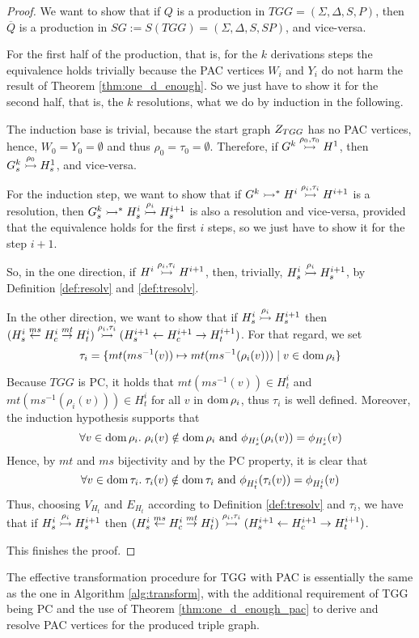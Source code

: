 \begin{proof}
	We want to show that if $Q$ is a production in $TGG = (\Sigma, \Delta, S, P)$, then $\overline{Q}$ is a production in $SG := S(TGG) = (\Sigma, \Delta, S, SP)$, and vice-versa.
	
	For the first half of the production, that is, for the $k$ derivations steps the equivalence holds trivially because the PAC vertices $W_i$ and $Y_i$ do not harm the result of Theorem \ref{thm:one_d_enough}. So we just have to show it for the second half, that is, the $k$ resolutions, what we do by induction in the following.
	
	The induction base is trivial, because the start graph $Z_{TGG}$ has no PAC vertices, hence, $W_0 = Y_0 = \emptyset$ and thus $\rho_0 = \tau_0 = \emptyset$. Therefore, if $G^k \overset{\rho_0,\tau_0}{\rightarrowtail} H^1$, then $G^k_s \overset{\rho_0}{\rightarrowtail} H_s^1$, and vice-versa.
	
	For the induction step, we want to show that if $G^k \rightarrowtail^*_{} H^i \overset{\rho_{i},\tau_{i}}{\rightarrowtail} H^{i+1}$ is a resolution, then $G^k_s \rightarrowtail^*_{} H^i_s \overset{\rho_{i}}{\rightarrowtail} H^{i+1}_s$ is also a resolution and vice-versa, provided that the equivalence holds for the first $i$ steps, so we just have to show it for the step $i+1$.
	
	So, in the one direction, if $H^i \overset{\rho_{i},\tau_{i}}{\rightarrowtail} H^{i+1}$, then, trivially, $H^i_s \overset{\rho_{i}}{\rightarrowtail} H^{i+1}_s$, by Definition \ref{def:resolv} and \ref{def:tresolv}.
	
	In the other direction, we want to show that if $H^i_s \overset{\rho_{i}}{\rightarrowtail} H^{i+1}_s$ then $(H^i_s \overset{ms}{\leftarrow} H^i_c \overset{mt}{\rightarrow} H^i_t) \overset{\rho_i,\tau_i}{\rightarrowtail} (H^{i+1}_s \overset{}{\leftarrow} H^{i+1}_c \overset{}{\rightarrow} H^{i+1}_t)$. For that regard, we set 
	\[
		\tau_i = \{mt(ms^{-1}(v)) \mapsto mt(ms^{-1}(\rho_i(v))) \; | \; v \in \operatorname{dom} \rho_i \}
	\]
	
	Because $TGG$ is PC, it holds that $mt(ms^{-1}(v)) \in H^i_t$ and $mt(ms^{-1}(\rho_i(v))) \in H^i_t$ for all $v$ in $\operatorname{dom} \rho_i$, thus $\tau_i$ is well defined. Moreover, the induction hypothesis supports that
	\[
		\forall v \in \operatorname{dom} \rho_i . \; \rho_i(v) \notin \operatorname{dom} \rho_i \text{ and } \phi_{H^i_s}(\rho_i(v)) = \phi_{H^i_s}(v)
	\]
	Hence, by $mt$ and $ms$ bijectivity and by the PC property, it is clear that
	\[
		\forall v \in \operatorname{dom} \tau_i . \; \tau_i(v) \notin \operatorname{dom} \tau_i \text{ and } \phi_{H^i_t}(\tau_i(v)) = \phi_{H^i_t}(v)
	\]
	Thus, choosing $V_{H_t}$ and $E_{H_t}$ according to Definition \ref{def:tresolv} and $\tau_i$, we have that if $H^i_s \overset{\rho_{i}}{\rightarrowtail} H^{i+1}_s$ then $(H^i_s \overset{ms}{\leftarrow} H^i_c \overset{mt}{\rightarrow} H^i_t) \overset{\rho_i,\tau_i}{\rightarrowtail} (H^{i+1}_s \overset{}{\leftarrow} H^{i+1}_c \overset{}{\rightarrow} H^{i+1}_t)$.
	
	This finishes the proof.
\end{proof}

The effective transformation procedure for TGG with PAC is essentially the same as the one in Algorithm \ref{alg:transform}, with the additional requirement of TGG being PC and the use of Theorem \ref{thm:one_d_enough_pac} to derive and resolve PAC vertices for the produced triple graph.